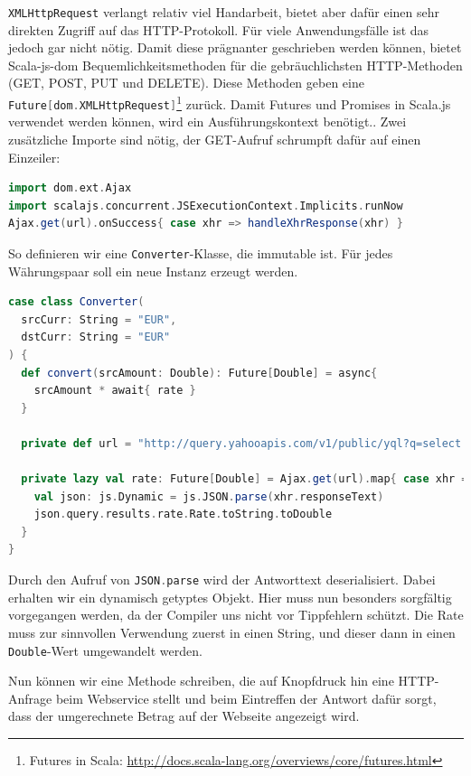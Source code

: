 \documentclass[a4paper, 12pt, hidelinks, listof=totoc, listoftables=totoc, bibliography=totoc]{scrreprt}
\newcommand{\code}[1]{\lstinline[language=Scala, style=inline]|#1|}
\newcommand{\scala}[1]{\lstinline[language=Scala, style=inline]|#1|}
\begin{document}
\code{XMLHttpRequest} verlangt relativ viel Handarbeit, bietet aber dafür einen sehr direkten Zugriff auf das HTTP-Protokoll. Für viele Anwendungsfälle ist das jedoch gar nicht nötig. Damit diese prägnanter geschrieben werden können, bietet Scala-js-dom Bequemlichkeitsmethoden für die gebräuchlichsten HTTP-Methoden (GET, POST, PUT und DELETE). Diese Methoden geben eine \scala{Future[dom.XMLHttpRequest]}\footnote{Futures in Scala: \url{http://docs.scala-lang.org/overviews/core/futures.html}} zurück. Damit Futures und Promises in Scala.js verwendet werden können, wird ein Ausführungskontext benötigt.. \cite[\#Extensions]{scala-js-dom.DOC} Zwei zusätzliche Importe sind nötig, der GET-Aufruf schrumpft dafür auf einen Einzeiler:

\begin{lstlisting}[language=Scala, caption={Futures-basierter HTTP-Aufruf mit Scala.js-Bequemlichkeitsmethode.}]
import dom.ext.Ajax
import scalajs.concurrent.JSExecutionContext.Implicits.runNow
Ajax.get(url).onSuccess{ case xhr => handleXhrResponse(xhr) }
\end{lstlisting}

So definieren wir eine \scala{Converter}-Klasse, die immutable ist. Für jedes Währungspaar soll ein neue Instanz erzeugt werden.

\begin{lstlisting}[language=Scala, caption={Der Währungsumrechner.}]
case class Converter(
  srcCurr: String = "EUR",
  dstCurr: String = "EUR"
) {
  def convert(srcAmount: Double): Future[Double] = async{
    srcAmount * await{ rate }
  }

  private def url = "http://query.yahooapis.com/v1/public/yql?q=select * from yahoo.finance.xchange where pair in ('" + srcCurr + dstCurr + "')&format=json&env=store://datatables.org/alltableswithkeys"

  private lazy val rate: Future[Double] = Ajax.get(url).map{ case xhr =>
    val json: js.Dynamic = js.JSON.parse(xhr.responseText)
    json.query.results.rate.Rate.toString.toDouble
  }
}
\end{lstlisting}

Durch den Aufruf von \scala{JSON.parse} wird der Antworttext deserialisiert. Dabei erhalten wir ein dynamisch getyptes Objekt. Hier muss nun besonders sorgfältig vorgegangen werden, da der Compiler uns nicht vor Tippfehlern schützt. Die Rate muss zur sinnvollen Verwendung zuerst in einen String, und dieser dann in einen \scala{Double}-Wert umgewandelt werden.

Nun können wir eine Methode schreiben, die auf Knopfdruck hin eine HTTP-Anfrage beim Webservice stellt und beim Eintreffen der Antwort dafür sorgt, dass der umgerechnete Betrag auf der Webseite angezeigt wird.
\end{document}
